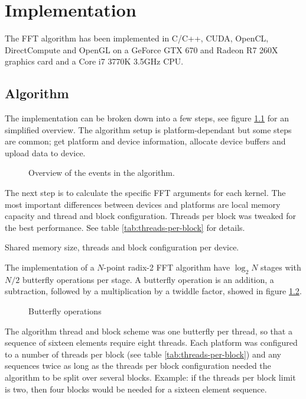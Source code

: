 \chapter{Implementation}

The FFT algorithm has been implemented in C/C++, CUDA, OpenCL, DirectCompute and OpenGL on a GeForce GTX 670 and Radeon R7 260X graphics card and a Core i7 3770K 3.5GHz CPU.

\section{Algorithm}

The implementation can be broken down into a few steps, see figure \ref{fig:algorithm-overview} for an simplified overview. The algorithm setup is platform-dependant but some steps are common; get platform and device information, allocate device buffers and upload data to device.

\begin{figure}
	\centering
	
	\caption{Overview of the events in the algorithm.}
	\label{fig:algorithm-overview}
\end{figure}

The next step is to calculate the specific FFT arguments for each kernel. The most important differences between devices and platforms are local memory capacity and thread and block configuration. Threads per block was tweaked for the best performance. See table \ref{tab:threads-per-block} for details.

\begin{table}
	\centering
	
	\caption{Shared memory size, threads and block configuration per device.}
	\label{tab:threads-per-block}
\end{table}

The implementation of a $N$-point radix-2 FFT algorithm have $\log_2 N$ stages with $N/2$ butterfly operations per stage. A butterfly operation is an addition, a subtraction, followed by a multiplication by a twiddle factor, showed in figure \ref{fig:butterfly}.

\begin{figure}[h]
	\centering
	
	\caption{Butterfly operations}
	\label{fig:butterfly}
\end{figure}

The algorithm thread and block scheme was one butterfly per thread, so that a sequence of sixteen elements require eight threads. Each platform was configured to a number of threads per block (see table \ref{tab:threads-per-block}) and any sequences twice as long as the threads per block configuration needed the algorithm to be split over several blocks. Example: if the threads per block limit is two, then four blocks would be needed for a sixteen element sequence.

